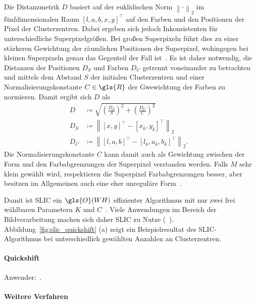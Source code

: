 Die Distanzmetrik $D$ basiert auf der euklidischen Norm ${\left\|\cdot\right\|}_2$ im fünfdimensionalen Raum ${\left[l,a,b,x,y\right]}^{\top}$ auf den Farben und den Positionen der Pixel \bzw{} der Clusterzentren.
Dabei ergeben sich jedoch Inkonsistenten für unterschiedliche Superpixelgrößen.
Bei großen Superpixeln führt dies zu einer stärkeren Gewichtung der räumlichen Positionen der Superpixel, wohingegen bei kleinen Superpixeln genau das Gegenteil der Fall ist~\cite{slic}.
Es ist daher notwendig, die Distanzen der Positionen $D_S$ und Farben $D_C$ getrennt voneinander zu betrachten und mittels dem Abstand $S$ der initialen Clusterzentren und einer Normalisierungskonstante $C \in \gls{R}$ \bzgl{} der Gwewichtung der Farben zu normieren.
Damit ergibt sich $D$ als~\cite{slic}
\begin{equation*}
\begin{split}
  D & \coloneqq \sqrt{{\left(\frac{D_S}{S}\right)}^2 + {\left(\frac{D_C}{C}\right)}^2}\\
  D_S & \coloneqq {\left\|{\left[x, y\right]}^{\top} - {\left[x_k, y_k\right]}^{\top}\right\|}_2\\
  D_C & \coloneqq {\left\|{\left[l, a, b\right]}^{\top} - {\left[l_k, a_k, b_k\right]}^{\top}\right\|}_2.
\end{split}
\end{equation*}
Die Normalisierungskonstante $C$ kann damit auch als Gewichtung zwischen der Form und den Farbabgrenzungen der Superpixel verstanden werden.
Falls $M$ sehr klein gewählt wird, respektieren die Superpixel Farbabgrenzungen besser, aber besitzen im Allgemeinen auch eine eher unreguläre Form~\cite{slic}.

Damit ist \gls{SLIC} ein $\gls{O}\left(WH\right)$ effizienter Algorithmus mit nur zwei frei wählbaren Parametern $K$ und $C$~\cite{slic}.
Viele Anwendungen im Bereich der Bildverarbeitung machen sich daher \gls{SLIC} zu Nutze (\vgl{}~\cite{Gadde, supercnn, super}).
Abbildung~\ref{fig:slic_quickshift} (a) zeigt ein Beispielresultat des \gls{SLIC}-Algorithmus bei unterschiedlich gewählten Anzahlen an Clusterzentren.



\paragraph{Quickshift}
\label{quickshift}

\cite{quickshift}
Anwender:~\cite{Fulkerson}.

\paragraph{Weitere Verfahren}
\label{weitere_superpixel_verfahren}

